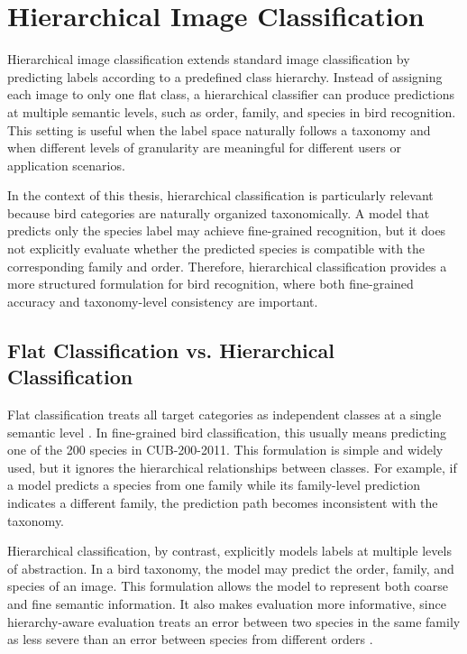 \section{Hierarchical Image Classification}

Hierarchical image classification \cite{silla2011survey,chang2021your,jiang2024hierarchical} extends standard image classification by predicting labels according to a predefined class hierarchy. Instead of assigning each image to only one flat class, a hierarchical classifier can produce predictions at multiple semantic levels, such as order, family, and species in bird recognition. This setting is useful when the label space naturally follows a taxonomy and when different levels of granularity are meaningful for different users or application scenarios.


In the context of this thesis, hierarchical classification is particularly relevant because bird categories are naturally organized taxonomically. A model that predicts only the species label may achieve fine-grained recognition, but it does not explicitly evaluate whether the predicted species is compatible with the corresponding family and order. Therefore, hierarchical classification provides a more structured formulation for bird recognition, where both fine-grained accuracy and taxonomy-level consistency are important.

\subsection{Flat Classification vs. Hierarchical Classification}

Flat classification treats all target categories as independent classes at a single semantic level \cite{silla2011survey}. In fine-grained bird classification, this usually means predicting one of the 200 species in CUB-200-2011. This formulation is simple and widely used, but it ignores the hierarchical relationships between classes. For example, if a model predicts a species from one family while its family-level prediction indicates a different family, the prediction path becomes inconsistent with the taxonomy.

Hierarchical classification, by contrast, explicitly models labels at multiple levels of abstraction. In a bird taxonomy, the model may predict the order, family, and species of an image. This formulation allows the model to represent both coarse and fine semantic information. It also makes evaluation more informative, since hierarchy-aware evaluation treats an error between two species in the same family as less severe than an error between species from different orders \cite{bertinetto2020making}.

